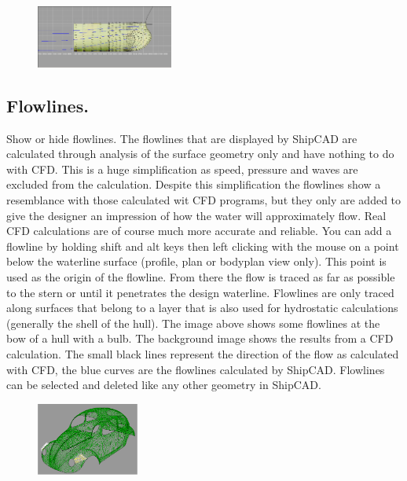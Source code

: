 \documentclass[12pt]{article}
\begin{document}
\begin{figure}
        \centering
        \includegraphics[width=0.4\textwidth,natwidth=693,natheight=318]{flowlines.png}
        \caption{}
        \label{fig:flowlines}
\end{figure}

\subsection{Flowlines.}
Show or hide flowlines. The flowlines that are displayed by ShipCAD
are calculated through analysis of the surface geometry only and have
nothing to do with CFD. This is a huge simplification as speed,
pressure and waves are excluded from the calculation. Despite this
simplification the flowlines show a resemblance with those calculated
wit CFD programs, but they only are added to give the designer an
impression of how the water will approximately flow. Real CFD
calculations are of course much more accurate and reliable. You can
add a flowline by holding shift and alt keys then left clicking with the
mouse on a point below the waterline surface (profile, plan or
bodyplan view only). This point is used as the origin of the
flowline. From there the flow is traced as far as possible to the
stern or until it penetrates the design waterline. Flowlines are only
traced along surfaces that belong to a layer that is also used for
hydrostatic calculations (generally the shell of the hull). The image
above shows some flowlines at the bow of a hull with a bulb. The
background image shows the results from a CFD calculation. The small
black lines represent the direction of the flow as calculated with
CFD, the blue curves are the flowlines calculated by
ShipCAD. Flowlines can be selected and deleted like any other geometry
in ShipCAD.

\begin{figure}
        \centering
        \includegraphics[width=0.3\textwidth,natwidth=437,natheight=309]{normals.png}
        \caption{}
        \label{fig:normals}
\end{figure}
\end{document}
